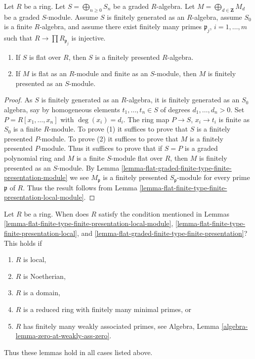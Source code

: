 \begin{lemma}
\label{lemma-flat-graded-finite-type-finite-presentation}
Let $R$ be a ring. Let $S = \bigoplus_{n \geq 0} S_n$ be a graded $R$-algebra.
Let $M = \bigoplus_{d \in \mathbf{Z}} M_d$ be a graded $S$-module.
Assume $S$ is finitely generated as an $R$-algebra, assume $S_0$ is a finite
$R$-algebra, and assume there exist finitely many primes
$\mathfrak p_j$, $i = 1, \ldots, m$ such that
$R \to \prod R_{\mathfrak p_j}$ is injective.
\begin{enumerate}
\item If $S$ is flat over $R$, then $S$ is a finitely presented $R$-algebra.
\item If $M$ is flat as an $R$-module and finite as an $S$-module,
then $M$ is finitely presented as an $S$-module.
\end{enumerate}
\end{lemma}

\begin{proof}
As $S$ is finitely generated as an $R$-algebra, it is finitely generated
as an $S_0$ algebra, say by homogeneous elements $t_1, \ldots, t_n \in S$
of degrees $d_1, \ldots, d_n > 0$. Set $P = R[x_1, \ldots, x_n]$ with
$\deg(x_i) = d_i$. The ring map $P \to S$, $x_i \to t_i$ is finite
as $S_0$ is a finite $R$-module. To prove (1) it suffices to prove
that $S$ is a finitely presented $P$-module.  To prove (2) it suffices
to prove that $M$ is a finitely presented $P$-module. Thus it suffices
to prove that if $S = P$ is a graded polynomial ring and $M$ is a finite
$S$-module flat over $R$, then $M$ is finitely presented as an $S$-module. By
Lemma \ref{lemma-flat-graded-finite-type-finite-presentation-module}
we see $M_{\mathfrak p}$ is a finitely presented $S_{\mathfrak p}$-module
for every prime $\mathfrak p$ of $R$. Thus the result follows from
Lemma \ref{lemma-flat-finite-type-finite-presentation-local-module}.
\end{proof}

\begin{remark}
\label{remark-when-does-condition-hold}
Let $R$ be a ring. When does $R$ satisfy the condition mentioned in
Lemmas \ref{lemma-flat-finite-type-finite-presentation-local-module},
\ref{lemma-flat-finite-type-finite-presentation-local}, and
\ref{lemma-flat-graded-finite-type-finite-presentation}?
This holds if
\begin{enumerate}
\item $R$ is local,
\item $R$ is Noetherian,
\item $R$ is a domain,
\item $R$ is a reduced ring with finitely many minimal primes, or
\item $R$ has finitely many weakly associated primes, see
Algebra, Lemma \ref{algebra-lemma-zero-at-weakly-ass-zero}.
\end{enumerate}
Thus these lemmas hold in all cases listed above.
\end{remark}


